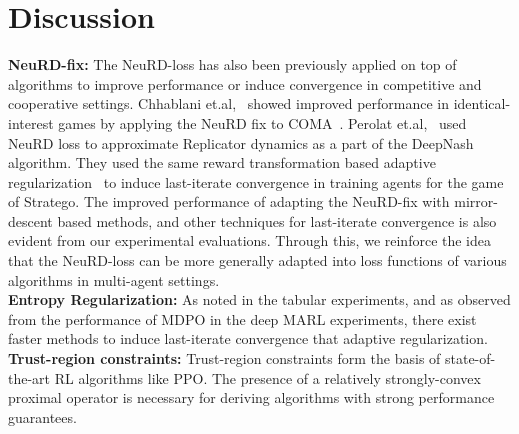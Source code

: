 \chapter{Discussion}

\textbf{NeuRD-fix:}
The NeuRD-loss has also been previously applied on top of algorithms to improve performance or
induce convergence in competitive and cooperative settings.
Chhablani et.al,~\cite{chhablaniCounterfactual2021} showed improved performance in
identical-interest games by applying the NeuRD fix to COMA~\cite{foersterCounterfactual2018}.
Perolat et.al,~\cite{perolatMastering2022} used NeuRD loss to approximate Replicator dynamics as a
part of the DeepNash algorithm.
They used the same reward transformation based adaptive regularization~\cite{perolatPoincare2021}
to induce last-iterate convergence in training agents for the game of Stratego.
The improved performance of adapting the NeuRD-fix with mirror-descent based methods, and other
techniques for last-iterate convergence is also evident from our experimental evaluations.
Through this, we reinforce the idea that the NeuRD-loss can be more generally adapted into loss
functions of various algorithms in multi-agent settings.
\\

\textbf{Entropy Regularization:}
As noted in the tabular experiments, and as observed from the performance of MDPO in the deep MARL
experiments, there exist faster methods to induce last-iterate convergence that adaptive
regularization.
\\

\textbf{Trust-region constraints:}
Trust-region constraints form the basis of state-of-the-art RL algorithms like PPO.
The presence of a relatively strongly-convex proximal operator is necessary for deriving algorithms
with strong performance guarantees.

